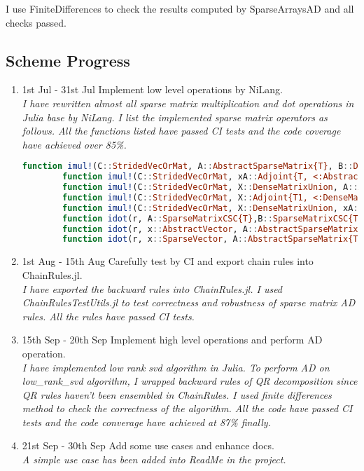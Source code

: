 I use FiniteDifferences to check the results computed by SparseArraysAD and all checks 
passed. 

\subsection{Scheme Progress}
\begin{enumerate}
    \item 1st Jul - 31st Jul \quad Implement low level operations by NiLang.  \\
    \textit{I have rewritten almost all sparse matrix multiplication and dot operations in Julia base by NiLang.  
    I list the implemented sparse matrix operators as follows. 
    All the functions listed have passed CI tests and the code coverage have achieved over 85\%.}
    \begin{lstlisting}[language=Julia]
        function imul!(C::StridedVecOrMat, A::AbstractSparseMatrix{T}, B::DenseInputVecOrMat, α::Number, β::Number) where T
        function imul!(C::StridedVecOrMat, xA::Adjoint{T, <:AbstractSparseMatrix}, B::DenseInputVecOrMat, α::Number, β::Number) where T
        function imul!(C::StridedVecOrMat, X::DenseMatrixUnion, A::AbstractSparseMatrix{T}, α::Number, β::Number) where T
        function imul!(C::StridedVecOrMat, X::Adjoint{T1, <:DenseMatrixUnion}, A::AbstractSparseMatrix{T2}, α::Number, β::Number) where {T1, T2}
        function imul!(C::StridedVecOrMat, X::DenseMatrixUnion, xA::Adjoint{T, <:AbstractSparseMatrix}, α::Number, β::Number) where T
        function idot(r, A::SparseMatrixCSC{T},B::SparseMatrixCSC{T}) where {T}
        function idot(r, x::AbstractVector, A::AbstractSparseMatrix{T1}, y::AbstractVector{T2}) where {T1, T2}
        function idot(r, x::SparseVector, A::AbstractSparseMatrix{T1}, y::SparseVector{T2}) where {T1, T2}
    \end{lstlisting}  
    \item 1st Aug - 15th Aug   \quad Carefully test by CI and export chain rules into ChainRules.jl.  \\
    \textit{I have exported the backward rules into ChainRules.jl. I used ChainRulesTestUtils.jl to test correctness and robustness of 
    sparse matrix AD rules. All the rules have passed CI tests.}
    \item 15th Sep - 20th Sep \quad  Implement high level operations and perform AD operation. \\
    \textit{I have implemented low rank svd algorithm in Julia. To perform AD on low\_rank\_svd algorithm, I wrapped backward rules of 
    QR decomposition since QR rules haven't been ensembled in ChainRules. I used finite differences method to check the correctness 
    of the algorithm. All the code have passed CI tests and the code converage have achieved at 87\% finally.}
    \item 21st Sep - 30th Sep \quad Add some use cases and enhance docs. \\
    \textit{A simple use case has been added into ReadMe in the project.}
\end{enumerate}
    
